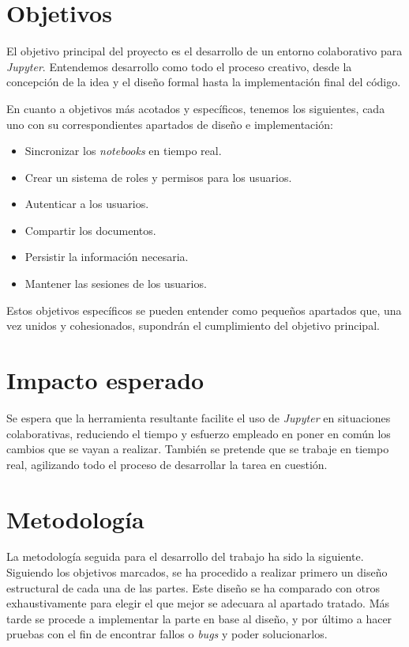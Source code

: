 \documentclass[11pt,spanish,listoffigures,listoftables]{tfgetsinf}
\begin{document}

\section{Objetivos}
\label{sec:objetivos}

El objetivo principal del proyecto es el desarrollo de un entorno colaborativo para \textit{Jupyter}. Entendemos desarrollo como todo el proceso creativo, desde la concepción de la idea y el diseño formal hasta la implementación final del código.

En cuanto a objetivos más acotados y específicos, tenemos los siguientes, cada uno con su correspondientes apartados de diseño e implementación:
\begin{itemize}
\item Sincronizar los \textit{notebooks} en tiempo real.
\item Crear un sistema de roles y permisos para los usuarios.
\item Autenticar a los usuarios.
\item Compartir los documentos.
\item Persistir la información necesaria.
\item Mantener las sesiones de los usuarios.
\end{itemize}

Estos objetivos específicos se pueden entender como pequeños apartados que, una vez unidos y cohesionados, supondrán el cumplimiento del objetivo principal.



\section{Impacto esperado}
\label{sec:impacto}

Se espera que la herramienta resultante facilite el uso de \textit{Jupyter} en situaciones colaborativas, reduciendo el tiempo y esfuerzo empleado en poner en común los cambios que se vayan a realizar. También se pretende que se trabaje en tiempo real, agilizando todo el proceso de desarrollar la tarea en cuestión. 



\section{Metodología}
\label{sec:metodologia}

La metodología seguida para el desarrollo del trabajo ha sido la siguiente. Siguiendo los objetivos marcados, se ha procedido a realizar primero un diseño estructural de cada una de las partes. Este diseño se ha comparado con otros exhaustivamente para elegir el que mejor se adecuara al apartado tratado. Más tarde se procede a implementar la parte en base al diseño, y por último a hacer pruebas con el fin de encontrar fallos o \textit{\gls{bug}s} y poder solucionarlos.
\end{document}
